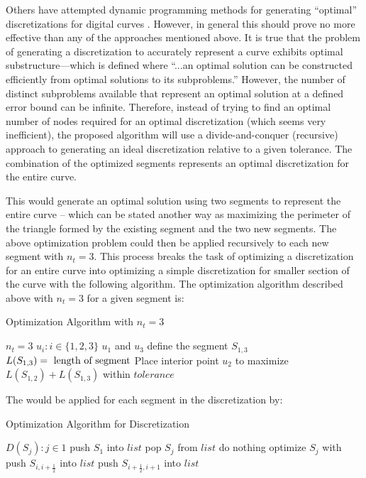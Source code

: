 Others have attempted dynamic programming methods for generating ``optimal'' discretizations for digital curves \cite{horng02}. However, in general this should prove no more effective than any of the approaches mentioned above. It is true that the problem of generating a discretization to accurately represent a curve exhibits optimal substructure—which is defined where ``...an optimal solution can be constructed efficiently from optimal solutions to its subproblems.'' \cite{cormen01} However, the number of distinct subproblems available that represent an optimal solution at a defined error bound can be infinite. Therefore, instead of trying to find an optimal number of nodes required for an optimal discretization (which seems very inefficient), the proposed algorithm will use a divide-and-conquer (recursive) approach to generating an ideal discretization relative to a given tolerance. The combination of the optimized segments represents an optimal discretization for the entire curve.

This would generate an optimal solution using two segments to represent the entire curve -- which can be stated another way as maximizing the perimeter of the triangle formed by the existing segment and the two new segments. The above optimization problem could then be applied recursively to each new segment with $n_t=3$. This process breaks the task of optimizing a discretization for an entire curve into optimizing a simple discretization for smaller section of the curve with the following algorithm. The optimization algorithm described above with $n_t=3$ for a given segment is:

\begin{algorithm}
\caption{Optimization Algorithm with $n_t=3$}\label{alg:localoptimize}
\begin{algorithmic}[1]
\State $n_t = 3$
\State $u_i : i \in \{1,2,3\}$
\State $u_1 $ and $u_3$ define the segment $S_{1,3}$
  \State $L(S_{1,3}) =\textnormal{ length of segment}$
  \State Place interior point $u_2$ to maximize $L(S_{1,2})+L(S_{1,3})$ within $tolerance$
\EndProcedure
\end{algorithmic}
\end{algorithm}

The would be applied for each segment in the discretization by:

\begin{algorithm}
\caption{Optimization Algorithm for Discretization}\label{alg:discreteoptimize}
\begin{algorithmic}
  \State $D(S_j) : j \in {1}$
  \State push $S_1$ into $list$ 
    \State pop $S_j$ from $list$
      \State do nothing
    \Else
      \State optimize $S_j$ with 
      \State push $S_{i,i+\frac{1}{2}}$ into $list$
      \State push $S_{i+\frac{1}{2},i+1}$ into $list$
    \EndIf
  \EndWhile
\end{algorithmic}
\end{algorithm}

